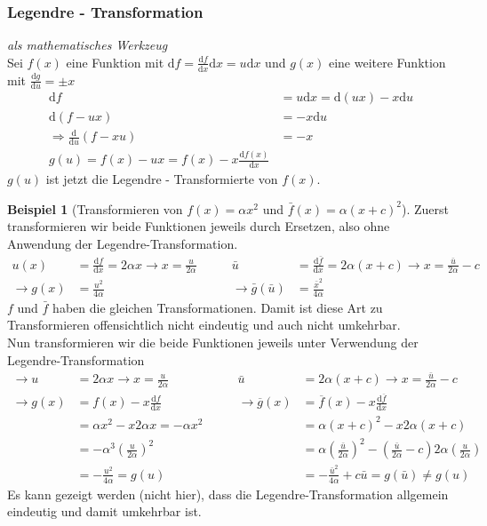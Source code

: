 \documentclass[oneside]{book}
\theoremstyle{definition}
\newtheorem*{beispiel*}{Beispiel}
\renewcommand{\d}{\mathrm d}
\newcommand{\md}{\d}
\begin{document}
\subsubsection{Legendre - Transformation} \textit{als mathematisches Werkzeug}\\
Sei $f(x)$ eine Funktion mit $\md f = \frac{\md f}{\md x} \md x = u \md x$ und $g(x)$ eine weitere Funktion mit $\frac{\md g}{\md u} = \pm x$
\begin{align*}
\md f &= u\md x = \md (ux) - x\md u\\
\md (f-ux) &= - x \md u\\
\Rightarrow \frac{\md}{\md u}(f-xu) &= -x\\
g(u) = f(x) - ux = f(x) - x\frac{\md f(x)}{\md x}
\end{align*}
$g(u)$ ist jetzt die Legendre - Transformierte von $f(x)$.
	
	
	
\begin{beispiel*}[Transformieren von $f(x) = \alpha x^2$ und $\bar{f}(x) = \alpha(x+c)^2$]
	Zuerst transformieren wir beide Funktionen jeweils durch Ersetzen, also ohne Anwendung der Legendre-Transformation.
\begin{align*}
u(x) &= \frac{\md f}{\md x} = 2 \alpha x \rightarrow x= \frac{u}{2\alpha} & \qquad   \bar u &= \frac{\md \bar f}{\md x} = 2\alpha(x+c) \rightarrow x=\frac{\bar u}{2\alpha} - c\\
\rightarrow g(x) &= \frac{u^2}{4\alpha} & \qquad  \rightarrow \bar g(\bar u) &= \frac{\bar x^2}{4\alpha}
\end{align*}
$f$ und $\bar f$ haben die gleichen Transformationen. Damit ist diese Art zu Transformieren offensichtlich nicht eindeutig und auch nicht umkehrbar.\\
Nun transformieren wir die beide Funktionen jeweils unter Verwendung der Legendre-Transformation
\begin{align*}
\rightarrow u &= 2\alpha x \rightarrow x= \frac {u}{2\alpha}      &  \qquad \bar{u} &= 2\alpha (x+c) \rightarrow x= \frac {\bar{u}}{2\alpha} -c\\
\rightarrow g(x) &= f(x) - x\frac{\md f}{\md x}  &  \qquad   \rightarrow \overline g(x) &= \overline f(x) - x\frac{\md \overline f}{\md x}\\
&= \alpha x^2 - x2\alpha x = -\alpha x^2         &    \qquad    &= \alpha (x+c)^2 - x 2\alpha( x+c)\\
&=-\alpha^3(\frac{u}{2\alpha})^2      &  \qquad    &= \alpha (\frac {\bar{u}}{2\alpha})^2 - (\frac {\bar u}{2\alpha} -c) 2\alpha( \frac {u}{2\alpha} )\\
&= -\frac{u^2}{4\alpha} = g(u)   &  \qquad    &= -\frac {\bar{u}^2}{4\alpha} +c\bar{u} = g(\bar{u}) \neq g(u)
\end{align*}
Es kann gezeigt werden (nicht hier), dass die Legendre-Transformation allgemein eindeutig und damit umkehrbar ist.
\end{beispiel*}
\end{document}
